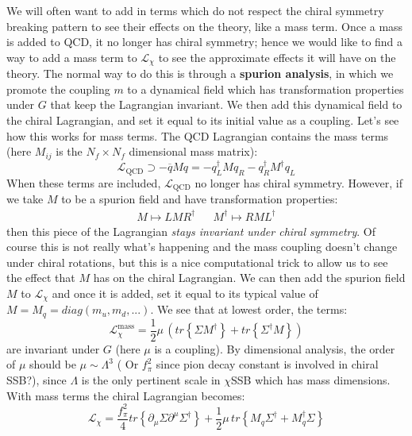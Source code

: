 \documentclass[11pt, oneside]{article}   	%
\theoremstyle{definition}
\numberwithin{equation}{subsection}		%
\begin{document}
We will often want to add in terms which do not respect the chiral symmetry breaking pattern to see their effects on the theory, like a mass 
term. Once a mass is added to QCD, it no longer has chiral symmetry; hence we would like to find a way to add a mass term to $\mathcal 
L_\chi$ to see the approximate effects it will have on the theory. The normal way to do this is through a \textbf{spurion analysis}, in which 
we promote the coupling $m$ to a dynamical field which has transformation properties under $G$ that keep the Lagrangian invariant. We 
then add this dynamical field to the chiral Lagrangian, and set it equal to its initial value as a coupling. Let's see how this works for mass 
terms. The QCD Lagrangian contains the mass terms (here $M_{ij}$ is the $N_f\times N_f$ dimensional mass matrix):
\begin{equation}
	\mathcal L_\mathrm{QCD}\supset -\overline q M q = -q_L^\dagger M q_R - q_R^\dagger M^\dagger q_L
\end{equation}
When these terms are included, $\mathcal L_\mathrm{QCD}$ no longer has chiral symmetry. However, if we take $M$ to be a spurion field and have transformation properties:
\begin{align}
	M\mapsto L M R^\dagger && M^\dagger\mapsto R M L^\dagger
\end{align}
then this piece of the Lagrangian \textit{stays invariant under chiral symmetry}. Of course this is not really what's happening and the mass 
coupling doesn't change under chiral rotations, but this is a nice computational trick to allow us to see the effect that $M$ has on the chiral 
Lagrangian. We can then add the spurion field $M$ to $\mathcal L_\chi$ and once it is added, set it equal to its typical value of $M = M_q 
= diag(m_u, m_d, ...)$. We see that at lowest order, the terms:
\begin{equation}
	\mathcal L_\chi^{\mathrm{mass}} = \frac{1}{2}\mu\,\left(tr\left\{\Sigma M^\dagger\right\} + tr\left\{\Sigma^\dagger M\right\} \right)
\end{equation}
are invariant under $G$ (here $\mu$ is a coupling). By dimensional analysis, the order of $\mu$ should be $\mu\sim \Lambda^3$ ({\color{red} Or $f_\pi^2$ since pion decay constant is involved in chiral SSB?}), since 
$\Lambda$ is the only pertinent scale in $\chi$SSB which has mass dimensions. With mass terms the chiral Lagrangian becomes:
\begin{equation}
	\mathcal L_\chi = \frac{f_\pi^2}{4} tr\left\{\partial_\mu\Sigma \partial^\mu\Sigma^\dagger\right\} + \frac{1}{2}\mu\,tr\left\{M_q\Sigma^\dagger + M_q^\dagger\Sigma\right\}
\end{equation}
\end{document}
